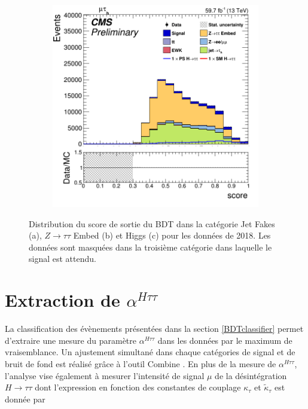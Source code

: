 \begin{figure}
\begin{subfigure}[b]{0.5\linewidth}
        \caption{} 
        \vspace{0.5ex}
    \end{subfigure}
        \begin{subfigure}[b]{\linewidth}
        \centering
        \includegraphics[scale=0.28]{Chapitre7/Images/CtrlPlots/2018/BDTscoreHiggs.png} 
        \caption{} 
        \vspace{0.5ex}
    \end{subfigure}
    \caption{Distribution du score de sortie du BDT dans la catégorie Jet Fakes (a), $Z\rightarrow\tau\tau$ Embed (b) et Higgs (c) pour les données de 2018. Les données sont masquées dans la troisième catégorie dans laquelle le signal est attendu.}
    \label{BDTscores}
\end{figure}

\section{Extraction de $\alpha^{H\tau\tau}$}
\label{extract}

La classification des évènements présentées dans la section \ref{BDTclassifier} permet d'extraire une mesure du paramètre $\alpha^{H\tau\tau}$ dans les données par le maximum de vraisemblance. Un ajustement simultané dans chaque catégories de signal et de bruit de fond est réalisé grâce à l'outil Combine \cite{combine}. En plus de la mesure de $\alpha^{H\tau\tau}$, l'analyse vise également à mesurer l'intensité de signal $\mu$ de la désintégration $H\to\tau\tau$ dont l'expression en fonction des constantes de couplage $\kappa_{\tau}$ et $\tilde{\kappa}_{\tau}$ est donnée par 

